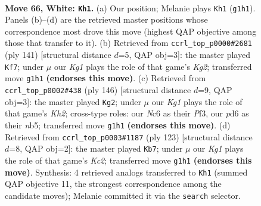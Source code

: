 \documentclass[11pt]{article}
\begin{document}
\clearpage

\begin{figure}[p]\centering
\begin{subfigure}{0.46\textwidth}\centering
\resizebox{\linewidth}{!}{%
\newchessgame
\chessboard[
  setfen={8/1R6/2Np4/8/5k2/6pp/8/4n1K1 w - - 0 66},
  showmover=false,
  pgfstyle=straightmove, color=movearrow, markmove={g1-h1}
]}
\caption{}
\end{subfigure}\hfill
\begin{subfigure}{0.46\textwidth}\centering
\resizebox{\linewidth}{!}{%
\newchessgame
\chessboard[
  setfen={8/6k1/3n4/6PP/5K2/2p5/2N5/8 b - - 4 71},
  showmover=false,
  pgfstyle=straightmove, color=movearrow, markmove={g7-f7}
]}
\caption{}
\end{subfigure}
\\[4pt]
\begin{subfigure}{0.46\textwidth}\centering
\resizebox{\linewidth}{!}{%
\newchessgame
\chessboard[
  setfen={8/8/8/1n3k2/5p1p/5P2/5N1K/8 w - - 18 74},
  showmover=false,
  pgfstyle=straightmove, color=movearrow, markmove={h2-g2}
]}
\caption{}
\end{subfigure}\hfill
\begin{subfigure}{0.46\textwidth}\centering
\resizebox{\linewidth}{!}{%
\newchessgame
\chessboard[
  setfen={8/p1k5/8/PP6/2K1n2N/8/8/8 b - - 2 62},
  showmover=false,
  pgfstyle=straightmove, color=movearrow, markmove={c7-b7}
]}
\caption{}
\end{subfigure}
\caption{\textbf{Move 66, White: \texttt{Kh1}.} (a) Our position; Melanie plays \texttt{Kh1} (\texttt{g1h1}). Panels (b)--(d) are the retrieved master positions whose correspondence most drove this move (highest QAP objective among those that transfer to it). (b) Retrieved from \texttt{ccrl\_top\_p0000\#2681} (ply 141) [structural distance $d$=5, QAP obj=3]: the master played \texttt{Kf7}; under $\mu$ our \emph{Kg1} plays the role of that game's \emph{Kg2}; transferred move \texttt{g1h1} \textbf{(endorses this move)}. (c) Retrieved from \texttt{ccrl\_top\_p0002\#438} (ply 146) [structural distance $d$=9, QAP obj=3]: the master played \texttt{Kg2}; under $\mu$ our \emph{Kg1} plays the role of that game's \emph{Kh2}; cross-type roles: our \emph{N}c6 as their \emph{P}f3, our \emph{p}d6 as their \emph{n}b5; transferred move \texttt{g1h1} \textbf{(endorses this move)}. (d) Retrieved from \texttt{ccrl\_top\_p0003\#1187} (ply 123) [structural distance $d$=8, QAP obj=2]: the master played \texttt{Kb7}; under $\mu$ our \emph{Kg1} plays the role of that game's \emph{Kc2}; transferred move \texttt{g1h1} \textbf{(endorses this move)}. Synthesis: 4 retrieved analogs transferred to \texttt{Kh1} (summed QAP objective 11, the strongest correspondence among the candidate moves); Melanie committed it via the \texttt{search} selector.}
\label{fig:thought-m130}
\end{figure}
\end{document}
